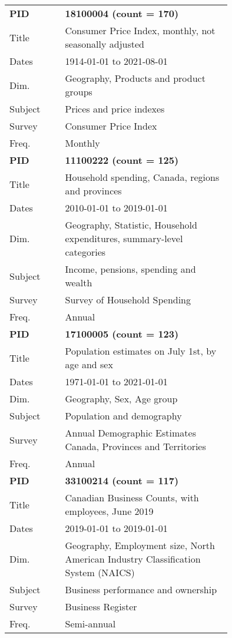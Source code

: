 \documentclass[11pt]{article}
\begin{document}
\begin{table}[h]
    \small
    \centering
    \begin{tabular}{l p{0.75\linewidth}}
\toprule
\textbf{PID} & \textbf{18100004 (count = 170)} \\
Title &  Consumer Price Index, monthly, not seasonally adjusted \\
Dates &  1914-01-01 to 2021-08-01 \\
Dim. &  Geography, Products and product groups \\
Subject &  Prices and price indexes \\
Survey &  Consumer Price Index \\
Freq. &  Monthly \\

\midrule
\textbf{PID} & \textbf{11100222 (count = 125)} \\
Title &  Household spending, Canada, regions and provinces \\
Dates &  2010-01-01 to 2019-01-01 \\
Dim. &  Geography, Statistic, Household expenditures, summary-level categories \\
Subject &  Income, pensions, spending and wealth \\
Survey &  Survey of Household Spending \\
Freq. &  Annual \\

\midrule
\textbf{PID} & \textbf{17100005 (count = 123)} \\
Title &  Population estimates on July 1st, by age and sex \\
Dates &  1971-01-01 to 2021-01-01 \\
Dim. &  Geography, Sex, Age group \\
Subject &  Population and demography \\
Survey &  Annual Demographic Estimates Canada, Provinces and Territories \\
Freq. &  Annual \\

\midrule
\textbf{PID} & \textbf{33100214 (count = 117)} \\
Title &  Canadian Business Counts, with employees, June 2019 \\
Dates &  2019-01-01 to 2019-01-01 \\
Dim. &  Geography, Employment size, North American Industry Classification System (NAICS) \\
Subject &  Business performance and ownership \\
Survey &  Business Register \\
Freq. &  Semi-annual \\


\end{tabular}
\end{table}
\end{document}
